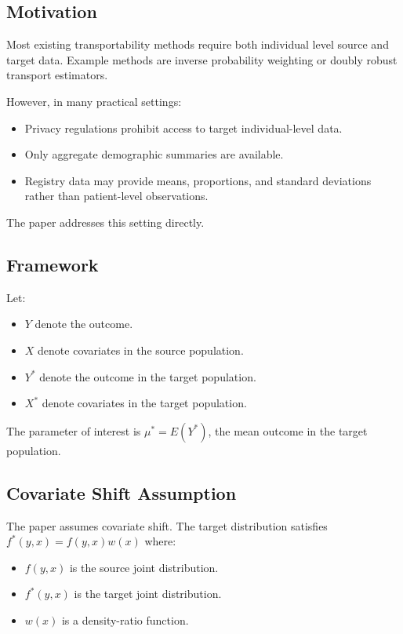 \documentclass[11pt]{article}
\begin{document}
\subsection*{Motivation}

Most existing transportability methods require both individual level source and target data. Example methods are inverse probability weighting or doubly robust transport estimators. 

However, in many practical settings:
\begin{itemize}
    \item Privacy regulations prohibit access to target individual-level data.
    \item Only aggregate demographic summaries are available.
    \item Registry data may provide means, proportions, and standard deviations rather than patient-level observations.
\end{itemize}
The paper addresses this setting directly.

\subsection*{Framework}

Let:
\begin{itemize}
    \item \(Y\) denote the outcome.
    \item \(X\) denote covariates in the source population.
    \item \(Y^*\) denote the outcome in the target population.
    \item \(X^*\) denote covariates in the target population.
\end{itemize}
The parameter of interest is $\mu^*=E(Y^*)$, the mean outcome in the target population.

\subsection*{Covariate Shift Assumption}

The paper assumes covariate shift. The target distribution satisfies $f^*(y,x)=f(y,x)w(x)$ where:
\begin{itemize}
    \item \(f(y,x)\) is the source joint distribution.
    \item \(f^*(y,x)\) is the target joint distribution.
    \item \(w(x)\) is a density-ratio function.
\end{itemize}
\end{document}
